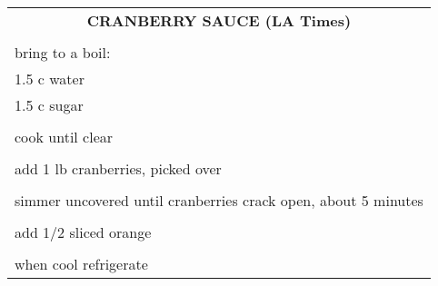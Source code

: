 \documentclass[8pt]{report}
\begin{document}
\newpage

\normalsize
\centering

\begin{tabular}{|l|} \hline	%
\multicolumn{1}{|c|}{\textbf{CRANBERRY SAUCE (LA Times)}}
\\
\\

\index{fish/meat!turkey (willa mae)!cranberry sauce} \index{cranberry
sauce} \index{sauce!cranberry} \index{turkey!cranberry sauce}



bring to a boil:\\
\hspace{0.5 in}	1.5 c water\\
\hspace{0.5 in}	1.5 c sugar\\
\\
cook until clear\\
\\
add 1 lb cranberries, picked over\\
\\
simmer uncovered until cranberries crack open, about 5 minutes\\
\\
add 1/2 sliced orange\\
\\
when cool refrigerate\\

\hline

\end{tabular}

\newpage
\LARGE
\end{document}
